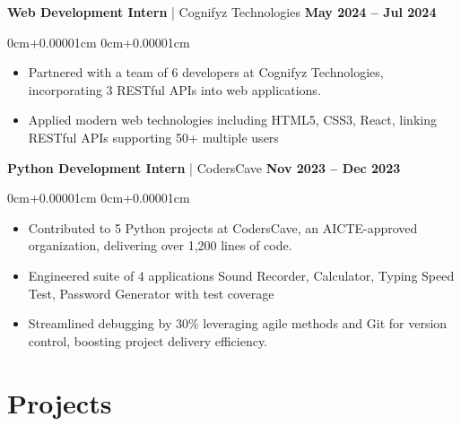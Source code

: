 \documentclass[10pt,a4paper]{article}
\newenvironment{highlights}{
    \begin{itemize}[
        topsep=0.10cm,
        parsep=0.10cm,
        partopsep=0pt,
        itemsep=0pt,
        leftmargin=0cm+10pt
    ]
    }{
    \end{itemize}
}
\newenvironment{onecolentry}{
    \begin{adjustwidth}{
        0cm+0.00001cm
    }{
        0cm+0.00001cm
    }
    }{
    \end{adjustwidth}
}
\begin{document}
    \textbf{Web Development Intern} | Cognifyz Technologies \hfill \textbf{May 2024 -- Jul 2024} \\
    \begin{onecolentry}
        \begin{highlights}
            \vspace{0.01cm}
            \item Partnered with a team of 6 developers at Cognifyz Technologies, incorporating 3 RESTful APIs into web applications.
            \item Applied modern web technologies including HTML5, CSS3, React, linking RESTful APIs supporting 50+ multiple users
        \end{highlights}
    \end{onecolentry}
    \vspace{0.01cm}
    \textbf{Python Development Intern} | CodersCave \hfill \textbf{Nov 2023 -- Dec 2023} \\
    \begin{onecolentry}
        \begin{highlights}
            \vspace{0.01cm}
            \item Contributed to 5 Python projects at CodersCave, an AICTE-approved organization, delivering over 1,200 lines of code.
            \item Engineered suite of 4 applications Sound Recorder, Calculator, Typing Speed Test, Password Generator with test coverage
            \item Streamlined debugging by 30\% leveraging agile methods and Git for version control, boosting project delivery efficiency. \\
        \end{highlights}
    \end{onecolentry}

    \section{Projects}\label{sec:projects}
\end{document}
